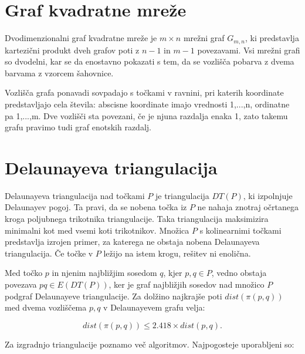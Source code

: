 \documentclass[a4paper, 12pt]{book}
\begin{document}
\section{Graf kvadratne mreže}
Dvodimenzionalni graf kvadratne mreže je $m \times n$ mrežni graf $G_{m,n}$, ki predstavlja kartezični produkt dveh grafov poti z $n-1$ in $m-1$ povezavami. Vsi mrežni grafi so dvodelni, kar se da enostavno pokazati s tem, da se vozlišča pobarva z dvema barvama z vzorcem šahovnice.


Vozlišča grafa ponavadi sovpadajo s točkami v ravnini, pri katerih koordinate predstavljajo cela števila: abscisne koordinate imajo vrednosti 1,...,n, ordinatne pa 1,...,m. Dve vozlišči sta povezani, če je njuna razdalja enaka 1, zato takemu grafu pravimo tudi graf enotskih razdalj.


\section{Delaunayeva triangulacija}
Delaunayeva triangulacija nad točkami $P$ je triangulacija $DT(P)$, ki izpolnjuje Delaunayev pogoj. Ta pravi, da se nobena točka iz $P$ ne nahaja znotraj očrtanega kroga poljubnega trikotnika triangulacije. Taka triangulacija
maksimizira minimalni kot med vsemi koti trikotnikov. Množica $P$ s kolinearnimi točkami predstavlja izrojen primer, za katerega ne obstaja nobena Delaunayeva triangulacija. Če točke v $P$ ležijo na istem krogu, rešitev ni enolična.

Med točko $p$ in njenim najbližjim sosedom $q$, kjer $p,q\in P$, vedno obstaja povezava $pq\in E(DT(P))$, ker je graf najbližjih sosedov nad množico $P$ podgraf Delaunayeve triangulacije. Za dolžino najkrajše poti $dist(\pi (p,q))$ med dvema 
vozliščema $p,q$ v Delaunayevem grafu velja:

\begin{equation}
dist(\pi (p,q)) \leq 2.418\times dist(p,q).
\end{equation}

Za izgradnjo triangulacije poznamo več algoritmov. Najpogosteje uporabljeni so: 
\end{document}
